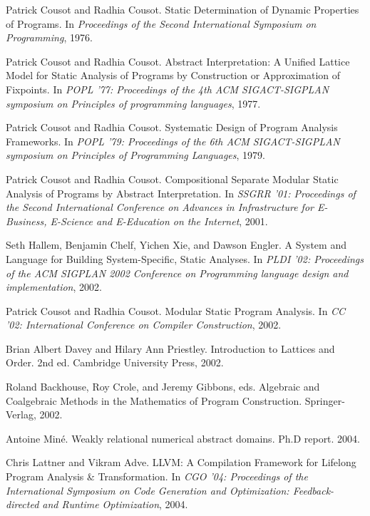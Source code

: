 \documentclass[a4paper]{book}
\begin{document}
\cleardoublepage
{}
\begin{thebibliography}{9}

 Patrick Cousot and Radhia Cousot.  Static Determination
  of Dynamic Properties of Programs.  In {\em Proceedings of the
    Second International Symposium on Programming}, 1976.

 Patrick Cousot and Radhia Cousot.  Abstract
  Interpretation: A Unified Lattice Model for Static Analysis of
  Programs by Construction or Approximation of Fixpoints.  In
  \emph{POPL '77: Proceedings of the 4th ACM SIGACT-SIGPLAN symposium
    on Principles of programming languages}, 1977.

 Patrick Cousot and Radhia Cousot.  Systematic Design of
  Program Analysis Frameworks.  In \emph{POPL '79: Proceedings of the
    6th ACM SIGACT-SIGPLAN symposium on Principles of Programming
    Languages}, 1979.

 Patrick Cousot and Radhia Cousot.  Compositional
  Separate Modular Static Analysis of Programs by Abstract
  Interpretation.  In \emph{SSGRR '01: Proceedings of the Second
    International Conference on Advances in Infrastructure for
    E-Business, E-Science and E-Education on the Internet}, 2001.

 Seth Hallem, Benjamin Chelf, Yichen Xie, and Dawson
  Engler.  A System and Language for Building System-Specific, Static
  Analyses.  In \emph{PLDI '02: Proceedings of the ACM SIGPLAN 2002
    Conference on Programming language design and implementation},
  2002.

 Patrick Cousot and Radhia Cousot.  Modular Static
  Program Analysis.  In \emph{CC '02: International Conference on
    Compiler Construction}, 2002.

 Brian Albert Davey and Hilary Ann
  Priestley. Introduction to Lattices and Order. 2nd ed. Cambridge
  University Press, 2002.

 Roland Backhouse, Roy Crole, and Jeremy Gibbons, eds.
  Algebraic and Coalgebraic Methods in the Mathematics of Program
  Construction.  Springer-Verlag, 2002.

 Antoine Miné.  Weakly relational numerical abstract
  domains. Ph.D report.  2004.

 Chris Lattner and Vikram Adve.  LLVM: A Compilation
  Framework for Lifelong Program Analysis \& Transformation. In
  \emph{CGO '04: Proceedings of the International Symposium on Code
    Generation and Optimization: Feedback-directed and Runtime
    Optimization}, 2004.


\end{thebibliography}
\end{document}
